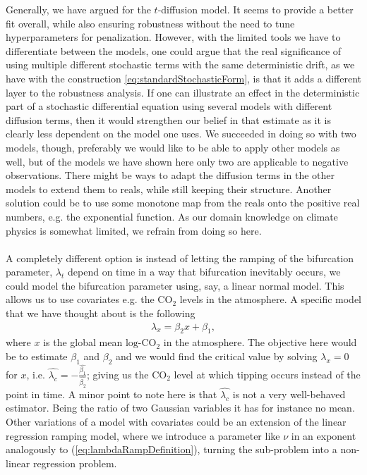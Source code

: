Generally, we have argued for the $t$-diffusion model. It seems to provide a better fit overall, while also ensuring robustness without the need to tune hyperparameters for penalization. However, with the limited tools we have to differentiate between the models, one could argue that the real significance of using multiple different stochastic terms with the same deterministic drift, as we have with the construction \ref{eq:standardStochasticForm}, is that it adds a different layer to the robustness analysis. If one can illustrate an effect in the deterministic part of a stochastic differential equation using several models with different diffusion terms, then it would strengthen our belief in that estimate as it is clearly less dependent on the model one uses. We succeeded in doing so with two models, though, preferably we would like to be able to apply other models as well, but of the models we have shown here only two are applicable to negative observations. There might be ways to adapt the diffusion terms in the other models to extend them to reals, while still keeping their structure. Another solution could be to use some monotone map from the reals onto the positive real numbers, e.g. the exponential function. As our domain knowledge on climate physics is somewhat limited, we refrain from doing so here.\\\\
A completely different option is instead of letting the ramping of the bifurcation parameter, $\lambda_t$ depend on time in a way that bifurcation inevitably occurs, we could model the bifurcation parameter using, say, a linear normal model. This allows us to use covariates e.g. the $\mathrm{CO}_2$ levels in the atmosphere. A specific model that we have thought about is the following
\begin{align}
    \lambda_x= \beta_2 x + \beta_1, \label{eq:alternativeLambda}
\end{align}
where $x$ is the global mean $\mathrm{log}$-$\mathrm{CO}_2$ in the atmosphere. The objective here would be to estimate $\beta_1$ and $\beta_2$ and we would find the critical value by solving $\lambda_x = 0$ for $x$, i.e. $\hat{\lambda_c} = -\frac{\hat{\beta_1}}{\hat{\beta_2}}$; giving us the $\mathrm{CO}_2$ level at which tipping occurs instead of the point in time. A minor point to note here is that $\hat{\lambda_c}$ is not a very well-behaved estimator. Being the ratio of two Gaussian variables it has for instance no mean. Other variations of a model with covariates could be an extension of the linear regression ramping model, where we introduce a parameter like $\nu$ in an exponent analogously to (\ref{eq:lambdaRampDefinition}), turning the sub-problem into a non-linear regression problem. \\\\
